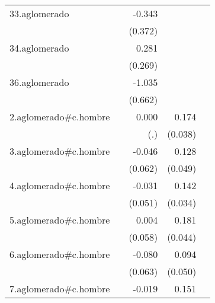 {\begin{longtable}{l*{4}{D{.}{.}{-1}}}
\addlinespace
33.aglomerado&                     &      -0.343         &                     &                     \\
            &                     &     (0.372)         &                     &                     \\
\addlinespace
34.aglomerado&                     &       0.281         &                     &                     \\
            &                     &     (0.269)         &                     &                     \\
\addlinespace
36.aglomerado&                     &      -1.035         &                     &                     \\
            &                     &     (0.662)         &                     &                     \\
\addlinespace
2.aglomerado#c.hombre&                     &       0.000         &       0.174\sym{***}&                     \\
            &                     &         (.)         &     (0.038)         &                     \\
\addlinespace
3.aglomerado#c.hombre&                     &      -0.046         &       0.128\sym{**} &                     \\
            &                     &     (0.062)         &     (0.049)         &                     \\
\addlinespace
4.aglomerado#c.hombre&                     &      -0.031         &       0.142\sym{***}&                     \\
            &                     &     (0.051)         &     (0.034)         &                     \\
\addlinespace
5.aglomerado#c.hombre&                     &       0.004         &       0.181\sym{***}&                     \\
            &                     &     (0.058)         &     (0.044)         &                     \\
\addlinespace
6.aglomerado#c.hombre&                     &      -0.080         &       0.094         &                     \\
            &                     &     (0.063)         &     (0.050)         &                     \\
\addlinespace
7.aglomerado#c.hombre&                     &      -0.019         &       0.151\sym{***}&                     \\

\end{longtable}}
